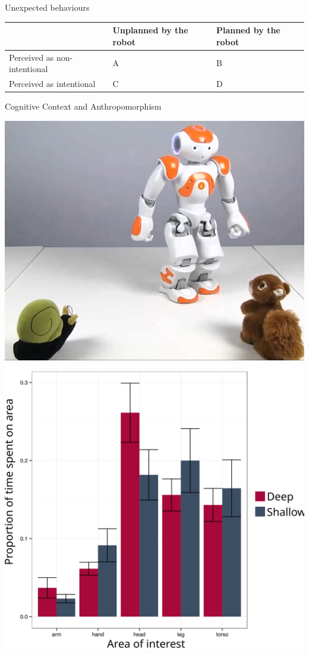 \documentclass[compress]{beamer}
\begin{document}

\begin{frame}{Unexpected behaviours}

    \centering
    \begin{tabular}{  >{\centering\arraybackslash}m{2cm} | >{\centering\arraybackslash}m{2cm} | >{\centering\arraybackslash}m{2cm} }
        & Unplanned by the robot & Planned by the robot \\ \hline
        Perceived as non-intentional & A  & B  \\ \hline
        Perceived as intentional &  C & D 
    \end{tabular}


\end{frame}


\begin{frame}{Cognitive Context and Anthropomorphism}
    \begin{center}
        \includegraphics[width=0.45\linewidth]{stimulus-toys}
        \hspace*{1cm}
        \includegraphics[width=0.45\linewidth]{cognitive-priming}
    \end{center}
\end{frame}
\end{document}

